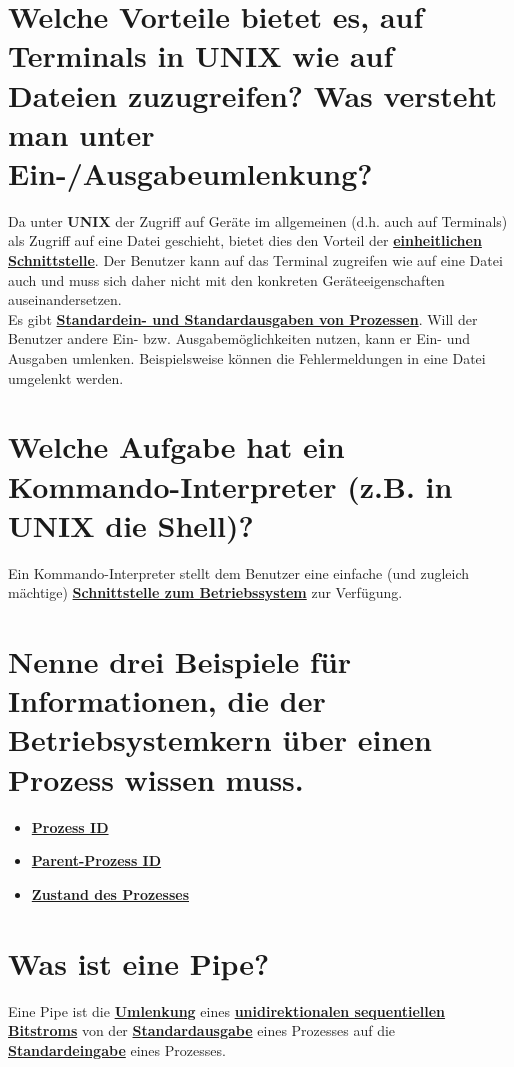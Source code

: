 \documentclass[12pt,a4paper,ngerman]{scrartcl}
\newcommand{\crucial}[1]{\textbf{\textcolor{crucial}{\uline{#1}}}}
\newcommand{\question}[1]{#1}
\newenvironment {answer}
                {}
                {}
\begin{document}
\section{\question{Welche Vorteile bietet es, auf Terminals in UNIX wie auf Dateien zuzugreifen? Was versteht man unter Ein-/Ausgabeumlenkung?}}
\begin{answer}
Da unter \textbf{UNIX} der Zugriff auf Geräte im allgemeinen (d.h. auch auf Terminals) als Zugriff
auf eine Datei geschieht, bietet dies den Vorteil der \crucial{einheitlichen Schnittstelle}. Der Benutzer
kann auf das Terminal zugreifen wie auf eine Datei auch und muss sich daher nicht mit den konkreten Geräteeigenschaften auseinandersetzen. \\
Es gibt \crucial{Standardein- und Standardausgaben von Prozessen}. Will der Benutzer andere Ein- bzw. Ausgabemöglichkeiten nutzen, kann er Ein- und Ausgaben umlenken. Beispielsweise können die Fehlermeldungen in eine Datei umgelenkt werden.
\end{answer}

\section{\question{Welche Aufgabe hat ein Kommando-Interpreter (z.B. in UNIX die Shell)?}}
\begin{answer}
Ein Kommando-Interpreter stellt dem Benutzer eine einfache (und zugleich mächtige) \crucial{Schnittstelle zum Betriebssystem} zur Verfügung.
\end{answer}

\section{\question{Nenne drei Beispiele für Informationen, die der Betriebsystemkern über einen Prozess wissen muss.}}
\begin{answer}
\begin{itemize}
\item \crucial{Prozess ID}
\item \crucial{Parent-Prozess ID}
\item \crucial{Zustand des Prozesses}
\end{itemize}

\end{answer}

\section{\question{Was ist eine Pipe?}}
\begin{answer}
Eine Pipe ist die \crucial{Umlenkung} eines \crucial{unidirektionalen sequentiellen Bitstroms} von der \crucial{Standardausgabe} eines Prozesses auf die \crucial{Standardeingabe} eines Prozesses.
\end{answer}
\end{document}

